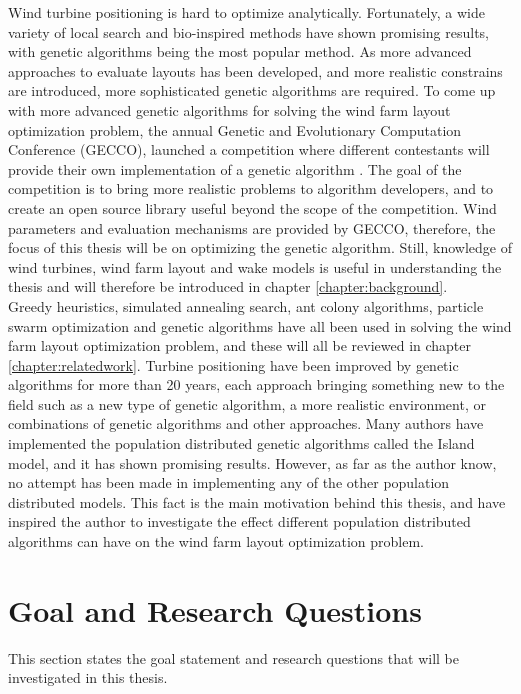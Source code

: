 \noindent Wind turbine positioning is hard to optimize analytically. Fortunately, a wide variety of local search and bio-inspired methods have shown promising results, with genetic algorithms being the most popular method. As more advanced approaches to evaluate layouts has been developed, and more realistic constrains are introduced, more sophisticated genetic algorithms are required. To come up with more advanced genetic algorithms for solving the wind farm layout optimization problem, the annual Genetic and Evolutionary Computation Conference (GECCO), launched a competition where different contestants will provide their own implementation of a genetic algorithm \citep{url2}. The goal of the competition is to bring more realistic problems to algorithm developers, and to create an open source library useful beyond the scope of the competition. Wind parameters and evaluation mechanisms are provided by GECCO, therefore, the focus of this thesis will be on optimizing the genetic algorithm. Still, knowledge of wind turbines, wind farm layout and wake models is useful in understanding the thesis and will therefore be introduced in chapter \ref{chapter:background}. \\

\noindent Greedy heuristics, simulated annealing search, ant colony algorithms, particle swarm optimization and genetic algorithms have all been used in solving the wind farm layout optimization problem, and these will all be reviewed in chapter \ref{chapter:relatedwork}. Turbine positioning have been improved by genetic algorithms for more than 20 years, each approach bringing something new to the field such as a new type of genetic algorithm, a more realistic environment, or combinations of genetic algorithms and other approaches. Many authors have implemented the population distributed genetic algorithms called the Island model, and it has shown promising results. However, as far as the author know, no attempt has been made in implementing any of the other population distributed models. This fact is the main motivation behind this thesis, and have inspired the author to investigate the effect different population distributed algorithms can have on the wind farm layout optimization problem. 


\section{Goal and Research Questions}\label{section:goal&researchquestions}
This section states the goal statement and research questions that will be investigated in this thesis. \\

